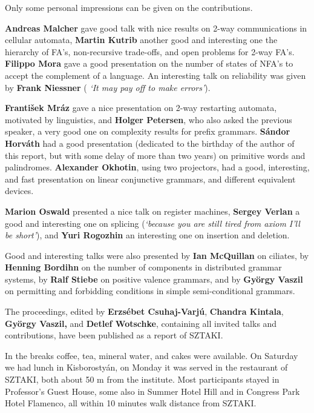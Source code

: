 \documentclass[final]{beatcs}
\begin{document}
\smallskip

Only some personal impressions can be given on the contributions.

{\bf Andreas Malcher} gave good talk with nice results on 2-way
communications in cellular automata, {\bf Martin Kutrib} another
good and interesting one the hierarchy of FA's, non-recursive trade-offs,
and open problems for 2-way FA's. {\bf Filippo Mora} gave a good presentation
on the number of states of NFA's to accept the complement of a language.
An interesting talk on reliability was given by {\bf Frank Niessner} ({\it
`It may pay off to make errors'}).

{\bf Franti\v{s}ek Mr\'{a}z} gave a nice presentation on 2-way
restarting automata, motivated by linguistics, and
{\bf Holger Petersen}, who also asked the previous speaker, a very good one on
complexity results for prefix grammars.
{\bf S\'{a}ndor Horv\'{a}th} had a good presentation (dedicated to
the birthday of the author of this report, but with some delay of more than
two years) on primitive words and palindromes.
 {\bf Alexander Okhotin}, using
two projectors, had a good, interesting, and fast presentation on
linear conjunctive grammars, and different equivalent devices.

{\bf Marion Oswald} presented a nice talk on register machines,
 {\bf Sergey Verlan} a good and interesting one on splicing
 ({\it `because you are still tired from axiom I'll be short'}),
and {\bf Yuri Rogozhin} an interesting one on insertion and deletion.

Good and interesting talks were also presented by {\bf Ian McQuillan}
on ciliates, by {\bf Henning Bordihn} on the number of components in
distributed grammar systems, by {\bf Ralf Stiebe} on positive valence grammars, and by
{\bf Gy\"{o}rgy Vaszil} on permitting and forbidding conditions in
simple semi-conditional grammars.

\medskip

{\sloppy
 The proceedings, edited by {\bf Erzs\'{e}bet Csuhaj-Varj\'{u}},
 {\bf Chandra Kintala}, {\bf Gy\"{o}rgy Vaszil,} and 
 {\bf Detlef Wotschke}, containing all invited talks and
 contributions, have been published as a report of {SZTAKI}.\par}

\bigskip

In the breaks coffee, tea, mineral water, and cakes were available.
On Saturday we had lunch in {Kisborosty\'{a}n},
 on Monday it was served in the restaurant of
{SZTAKI}, both about 50 m from the institute.
Most participants stayed in {Professor's Guest House}, some also in
{Summer Hotel Hill} and in {Congress Park Hotel Flamenco},
all within 10 minutes walk distance from {SZTAKI}.
\end{document}

